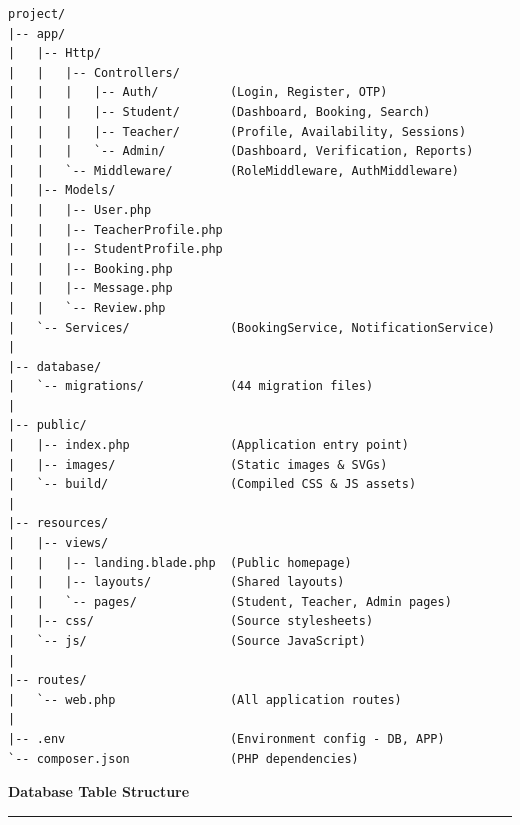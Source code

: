 \documentclass[12pt,a4paper]{report}
\begin{document}
\begin{lstlisting}[language={},basicstyle=\ttfamily\small,frame=single,numbers=none]
project/
|-- app/
|   |-- Http/
|   |   |-- Controllers/
|   |   |   |-- Auth/          (Login, Register, OTP)
|   |   |   |-- Student/       (Dashboard, Booking, Search)
|   |   |   |-- Teacher/       (Profile, Availability, Sessions)
|   |   |   `-- Admin/         (Dashboard, Verification, Reports)
|   |   `-- Middleware/        (RoleMiddleware, AuthMiddleware)
|   |-- Models/
|   |   |-- User.php
|   |   |-- TeacherProfile.php
|   |   |-- StudentProfile.php
|   |   |-- Booking.php
|   |   |-- Message.php
|   |   `-- Review.php
|   `-- Services/              (BookingService, NotificationService)
|
|-- database/
|   `-- migrations/            (44 migration files)
|
|-- public/
|   |-- index.php              (Application entry point)
|   |-- images/                (Static images & SVGs)
|   `-- build/                 (Compiled CSS & JS assets)
|
|-- resources/
|   |-- views/
|   |   |-- landing.blade.php  (Public homepage)
|   |   |-- layouts/           (Shared layouts)
|   |   `-- pages/             (Student, Teacher, Admin pages)
|   |-- css/                   (Source stylesheets)
|   `-- js/                    (Source JavaScript)
|
|-- routes/
|   `-- web.php                (All application routes)
|
|-- .env                       (Environment config - DB, APP)
`-- composer.json              (PHP dependencies)
\end{lstlisting}

\newpage
\thispagestyle{plain}
{\large\bfseries Database Table Structure}\\[0.6pt]
\rule{\textwidth}{0.6pt}

\vspace{0.3cm}
\end{document}
